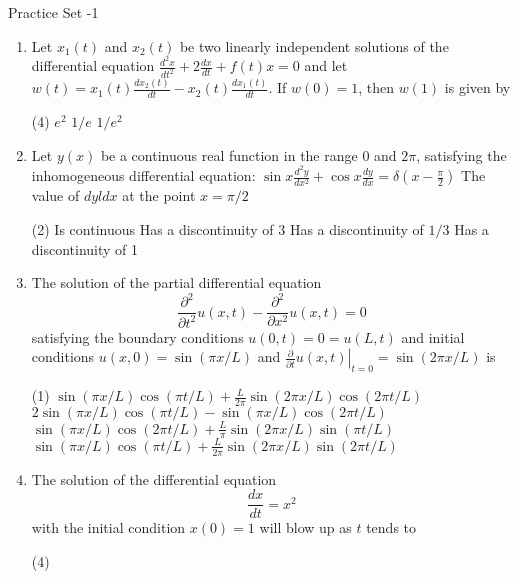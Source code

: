 \newpage
\begin{abox}
	Practice Set -1
\end{abox}
\begin{enumerate}[label=\color{ocre}\textbf{\arabic*.}]	
	\item Let $x_{1}(t)$ and $x_{2}(t)$ be two linearly independent solutions of the differential equation $\frac{d^{2} x}{d t^{2}}+2 \frac{d x}{d t}+f(t) x=0$ and let $w(t)=x_{1}(t) \frac{d x_{2}(t)}{d t}-x_{2}(t) \frac{d x_{1}(t)}{d t} .$ If $w(0)=1$, then $w(1)$ is given by
	{}
			\begin{tasks}(4)
			\task[\textbf{B.}] $e^{2}$
			\task[\textbf{C.}]  $1 / e$
			\task[\textbf{D.}] $1 / e^{2}$
		\end{tasks}
\item Let $y(x)$ be a continuous real function in the range 0 and $2 \pi$, satisfying the inhomogeneous differential equation: $\sin x \frac{d^{2} y}{d x^{2}}+\cos x \frac{d y}{d x}=\delta\left(x-\frac{\pi}{2}\right)$ The value of $d y l d x$ at the point $x=\pi / 2$
{}
\begin{tasks}(2)
	\task[\textbf{A.}] Is continuous
	\task[\textbf{B.}] Has a discontinuity of 3
	\task[\textbf{C.}] Has a discontinuity of $1 / 3$
	\task[\textbf{D.}] Has a discontinuity of 1
\end{tasks}
\item The solution of the partial differential equation
$$
\frac{\partial^{2}}{\partial t^{2}} u(x, t)-\frac{\partial^{2}}{\partial x^{2}} u(x, t)=0
$$
satisfying the boundary conditions $u(0, t)=0=u(L, t)$ and initial conditions $u(x, 0)=\sin (\pi x / L)$ and $\left.\frac{\partial}{\partial t} u(x, t)\right|_{t=0}=\sin (2 \pi x / L)$ is
{}
	\begin{tasks}(1)
		\task[\textbf{A.}] $\sin (\pi x / L) \cos (\pi t / L)+\frac{L}{2 \pi} \sin (2 \pi x / L) \cos (2 \pi t / L)$
		\task[\textbf{B.}] $2 \sin (\pi x / L) \cos (\pi t / L)-\sin (\pi x / L) \cos (2 \pi t / L)$
		\task[\textbf{C.}] $\sin (\pi x / L) \cos (2 \pi t / L)+\frac{L}{\pi} \sin (2 \pi x / L) \sin (\pi t / L)$
		\task[\textbf{D.}] $\sin (\pi x / L) \cos (\pi t / L)+\frac{L}{2 \pi} \sin (2 \pi x / L) \sin (2 \pi t / L)$
	\end{tasks}
	\item The solution of the differential equation
	$$
	\frac{d x}{d t}=x^{2}
	$$
	with the initial condition $x(0)=1$ will blow up as $t$ tends to
	{}
	\begin{tasks}(4)

\end{tasks}
\end{enumerate}
